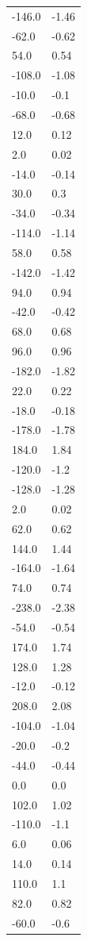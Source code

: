 \begin{longtable}{ll}
-146.0 & -1.46 \\
-62.0 & -0.62 \\
54.0 & 0.54 \\
-108.0 & -1.08 \\
-10.0 & -0.1 \\
-68.0 & -0.68 \\
12.0 & 0.12 \\
2.0 & 0.02 \\
-14.0 & -0.14 \\
30.0 & 0.3 \\
-34.0 & -0.34 \\
-114.0 & -1.14 \\
58.0 & 0.58 \\
-142.0 & -1.42 \\
94.0 & 0.94 \\
-42.0 & -0.42 \\
68.0 & 0.68 \\
96.0 & 0.96 \\
-182.0 & -1.82 \\
22.0 & 0.22 \\
-18.0 & -0.18 \\
-178.0 & -1.78 \\
184.0 & 1.84 \\
-120.0 & -1.2 \\
-128.0 & -1.28 \\
2.0 & 0.02 \\
62.0 & 0.62 \\
144.0 & 1.44 \\
-164.0 & -1.64 \\
74.0 & 0.74 \\
-238.0 & -2.38 \\
-54.0 & -0.54 \\
174.0 & 1.74 \\
128.0 & 1.28 \\
-12.0 & -0.12 \\
208.0 & 2.08 \\
-104.0 & -1.04 \\
-20.0 & -0.2 \\
-44.0 & -0.44 \\
0.0 & 0.0 \\
102.0 & 1.02 \\
-110.0 & -1.1 \\
6.0 & 0.06 \\
14.0 & 0.14 \\
110.0 & 1.1 \\
82.0 & 0.82 \\
-60.0 & -0.6 \\

\end{longtable}
